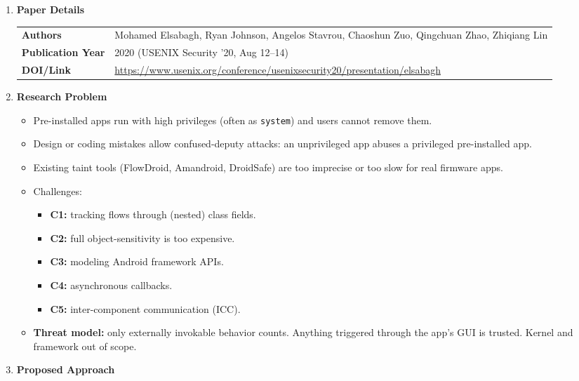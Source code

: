 \documentclass[11pt,a4paper]{article}
\newcommand{\entrypart}[1]{\textbf{\color{accent}#1}\par\vspace{2pt}}
\begin{document}
\begin{enumerate}

    \item \entrypart{Paper Details}

    \begin{tabular}{@{}>{\bfseries}p{3.2cm} p{11.5cm}@{}}
        Authors          & Mohamed Elsabagh, Ryan Johnson, Angelos Stavrou, Chaoshun Zuo, Qingchuan Zhao, Zhiqiang Lin \\[2pt]
        Publication Year & 2020 (USENIX Security '20, Aug 12--14) \\[2pt]
        DOI/Link         & \url{https://www.usenix.org/conference/usenixsecurity20/presentation/elsabagh}
    \end{tabular}

    \item \entrypart{Research Problem}

    \begin{itemize}
        \item Pre-installed apps run with high privileges (often as \texttt{system}) and users cannot remove them.
        \item Design or coding mistakes allow confused-deputy attacks: an unprivileged app abuses a privileged pre-installed app.
        \item Existing taint tools (FlowDroid, Amandroid, DroidSafe) are too imprecise or too slow for real firmware apps.
        \item Challenges:
        \begin{itemize}
            \item \textbf{C1:} tracking flows through (nested) class fields.
            \item \textbf{C2:} full object-sensitivity is too expensive.
            \item \textbf{C3:} modeling Android framework APIs.
            \item \textbf{C4:} asynchronous callbacks.
            \item \textbf{C5:} inter-component communication (ICC).
        \end{itemize}
        \item \textbf{Threat model:} only externally invokable behavior counts. Anything triggered through the app's GUI is trusted. Kernel and framework out of scope.
    \end{itemize}

    \item \entrypart{Proposed Approach}


\end{enumerate}
\end{document}
